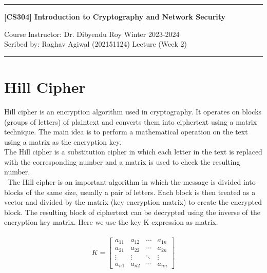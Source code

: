 \documentclass[11pt]{article}
\begin{document}
\noindent
\rule{\textwidth}{1pt}
\begin{center}
{\bf [CS304] Introduction to Cryptography and Network Security}
\end{center}
Course Instructor: Dr. Dibyendu Roy \hfill Winter 2023-2024\\
Scribed by: Raghav Agiwal (202151124) \hfill Lecture (Week 2\))
\\
\rule{\textwidth}{1pt}

\section{Hill Cipher}

\begin{itemize}
    
Hill cipher is an encryption algorithm used in cryptography. It operates on blocks (groups of letters) of plaintext and converts them into ciphertext using a matrix technique. The main idea is to perform a mathematical operation on the text using a matrix as the encryption key.\\
The Hill cipher is a substitution cipher in which each letter in the text is replaced with the corresponding number and a matrix is used to check the resulting number.\\\
The Hill cipher is an important algorithm in which the message is divided into blocks of the same size, usually a pair of letters. Each block is then treated as a vector and divided by the
matrix (key encryption matrix) to create the encrypted block. The resulting block of ciphertext can be decrypted using the inverse of the encryption key matrix.
Here we use the key K expression as matrix.\\\\

\[ K = \begin{bmatrix} a_{11} & a_{12} & \cdots & a_{1n} \\ a_{21} & a_{22} & \cdots & a_{2n} \\ \vdots & \vdots & \ddots & \vdots \\ a_{n1} & a_{n2} & \cdots & a_{nn} \end{bmatrix} \]


\end{itemize}
\end{document}
